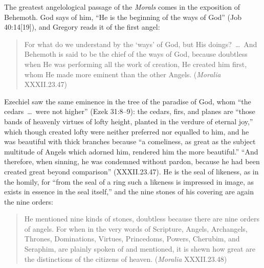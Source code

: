 The greatest angelological passage of the \emph{Morals} comes in the
exposition of Behemoth. God says of him, ``He is the beginning of the ways of
God'' (Job 40:14[19]), and Gregory reads it of the first angel:

\begin{quote}
For what do we understand by the `ways' of God, but His doings?~\dots\ And
Behemoth is said to be the chief of the ways of God, because doubtless when
He was performing all the work of creation, He created him first, whom He
made more eminent than the other Angels. (\emph{Moralia} XXXII.23.47)
\end{quote}

\noindent Ezechiel saw the same eminence in the tree of the paradise of God,
whom ``the cedars~\dots\ were not higher'' (Ezek 31:8--9): the cedars, firs,
and planes are ``those bands of heavenly virtues of lofty height, planted in
the verdure of eternal joy,'' which though created lofty were neither
preferred nor equalled to him, and he was beautiful with thick branches
because ``a comeliness, as great as the subject multitude of Angels which
adorned him, rendered him the more beautiful.'' ``And therefore, when
sinning, he was condemned without pardon, because he had been created great
beyond comparison'' (XXXII.23.47). He is the seal of likeness, as in the
homily, for ``from the seal of a ring such a likeness is impressed in image,
as exists in essence in the seal itself,'' and the nine stones of his covering
are again the nine orders:

\begin{quote}
He mentioned nine kinds of stones, doubtless because there are nine orders
of angels. For when in the very words of Scripture, Angels, Archangels,
Thrones, Dominations, Virtues, Princedoms, Powers, Cherubim, and Seraphim,
are plainly spoken of and mentioned, it is shewn how great are the
distinctions of the citizens of heaven. (\emph{Moralia} XXXII.23.48)
\end{quote}

